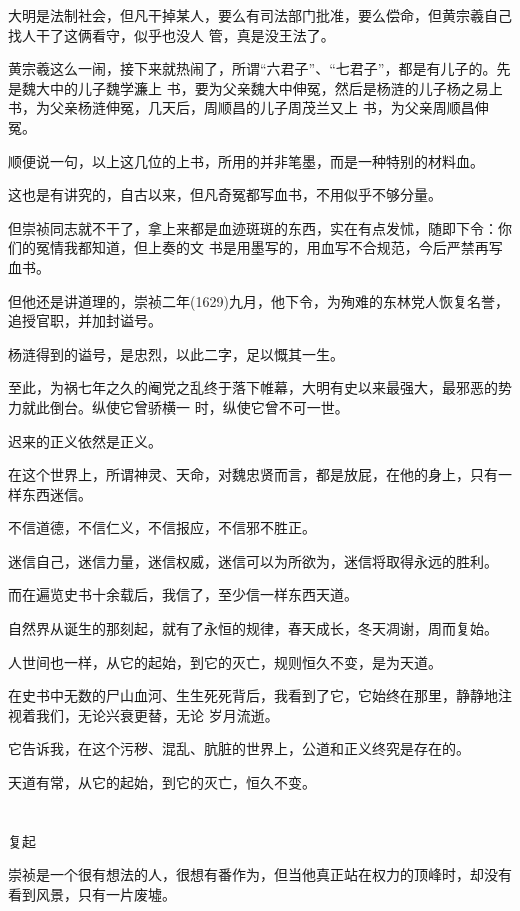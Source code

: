 \documentclass[11pt,a4paper,onecolumn]{article}
\begin{document}
大明是法制社会，但凡干掉某人，要么有司法部门批准，要么偿命，但黄宗羲自己找人干了这俩看守，似乎也没人
管，真是没王法了。

黄宗羲这么一闹，接下来就热闹了，所谓``六君子''、``七君子''，都是有儿子的。先是魏大中的儿子魏学濂上
书，要为父亲魏大中伸冤，然后是杨涟的儿子杨之易上书，为父亲杨涟伸冤，几天后，周顺昌的儿子周茂兰又上
书，为父亲周顺昌伸冤。

顺便说一句，以上这几位的上书，所用的并非笔墨，而是一种特别的材料\myrule 血。

这也是有讲究的，自古以来，但凡奇冤都写血书，不用似乎不够分量。

但崇祯同志就不干了，拿上来都是血迹斑斑的东西，实在有点发怵，随即下令：你们的冤情我都知道，但上奏的文
书是用墨写的，用血写不合规范，今后严禁再写血书。

但他还是讲道理的，崇祯二年(1629)九月，他下令，为殉难的东林党人恢复名誉，追授官职，并加封谥号。

杨涟得到的谥号，是忠烈，以此二字，足以慨其一生。

至此，为祸七年之久的阉党之乱终于落下帷幕，大明有史以来最强大，最邪恶的势力就此倒台。纵使它曾骄横一
时，纵使它曾不可一世。

迟来的正义依然是正义。

在这个世界上，所谓神灵、天命，对魏忠贤而言，都是放屁，在他的身上，只有一样东西\myrule 迷信。

不信道德，不信仁义，不信报应，不信邪不胜正。

迷信自己，迷信力量，迷信权威，迷信可以为所欲为，迷信将取得永远的胜利。

而在遍览史书十余载后，我信了，至少信一样东西\myrule 天道。

自然界从诞生的那刻起，就有了永恒的规律，春天成长，冬天凋谢，周而复始。

人世间也一样，从它的起始，到它的灭亡，规则恒久不变，是为天道。

在史书中无数的尸山血河、生生死死背后，我看到了它，它始终在那里，静静地注视着我们，无论兴衰更替，无论
岁月流逝。

它告诉我，在这个污秽、混乱、肮脏的世界上，公道和正义终究是存在的。

天道有常，从它的起始，到它的灭亡，恒久不变。

\section[\thesection]{}

复起

崇祯是一个很有想法的人，很想有番作为，但当他真正站在权力的顶峰时，却没有看到风景，只有一片废墟。
\end{document}
